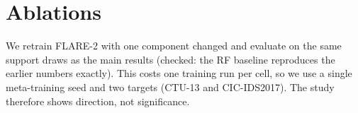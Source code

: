 \section{Ablations}\label{sec:ablation}
We retrain FLARE-2 with one component changed and evaluate on the same support draws as the main results (checked: the RF baseline reproduces the earlier numbers exactly).
This costs one training run per cell, so we use a single meta-training seed and two targets (CTU-13 and CIC-IDS2017).
The study therefore shows direction, not significance.

\begin{table}[t]
\centering\small
\caption{Ablations, seed 0, 10 support draws per $k$ for binary metrics; class-level metrics use 10 draws for the no-permutation, in-source and CIC-IDS2017 loss-mask rows and 5 for the others. Binary ROC-AUC at $k\in\{4,16,64\}$, $N$-way macro-F1 at $k{=}16$ per class, and per-class ROC-AUC at $k{=}4$. Rows are compared with their own reference: the first three rows with FLARE-2, the last two with the loss-masked model.}\label{tab:ablation}
\resizebox{\linewidth}{!}{}
\end{table}

